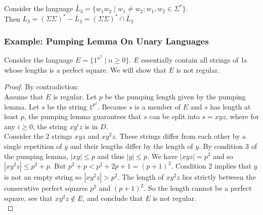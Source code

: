 \documentclass[11pt,a4paper]{article}
\begin{document}
\begin{example}
    Consider the language $\tilde{L_3}=\{w_1w_2\mid w_1\neq w_2;w_1,w_2\in \Sigma^*\}$. \\

    Then $L_3=(\Sigma\Sigma)^*-\tilde{L_3}=(\Sigma\Sigma)^*\cap \tilde{L_3}$
\end{example}

\subsubsection{Example: Pumping Lemma On Unary Languages}
\begin{example}
    Consider the language $E=\{1^{n^2}\mid n\geq 0\}$. $E$ essentially contain all strings of 1s whose lengths is a perfect square. We will show that $E$ is not regular. \\

    \begin{proof} By contradiction: \\

        Assume that $E$ is regular. Let $p$ be the pumping length given by the pumping lemma. Let $s$ be the string $1^{p^2}$.
        Because $s$ is a member of $E$ and $s$ has length at least $p$, the pumping lemma guarantees that $s$ can be split into $s=xyz$, where for any $i\geq 0$, the string $xy^iz$ is in $D$. \\

        Consider the 2 strings $xyz$ and $xy^2z$. These strings differ from each other by a single repetition of $y$ and their lengths differ by the length of $y$. By condition 3 of the pumping lemma, $|xy|\leq p$ and thus $|y|\leq p$.
        We have $|xyz|=p^2$ and so $|xy^2z|\leq p^2+p$. But $p^2+p<p^2+2p+1=(p+1)^2$. Condition 2 implies that $y$ is not an empty string so $|xy^2z|>p^2$. The length of $xy^2z$ lies strictly between the consecutive perfect squares $p^2$ and $(p+1)^2$.
        So the length cannot be a perfect square, see that $xy^2z\notin E$, and conclude that $E$ is not regular. \\
    \end{proof}
\end{example}
\end{document}

